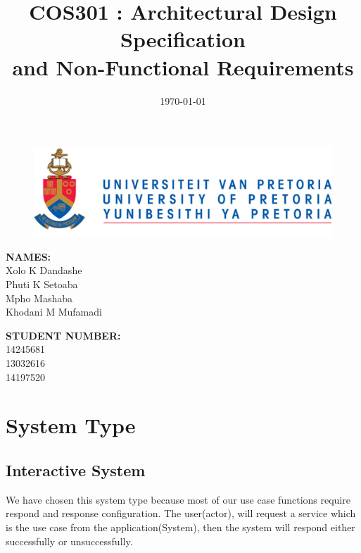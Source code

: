 \documentclass[english]{article}
\title{COS301 : Architectural Design Specification \\and Non-Functional Requirements}
\date{\today}
\begin{document}
	\maketitle
	\begin{figure}[!t]
		\includegraphics{up_logo.png}
	\end{figure}
	\begin{minipage}{0.4\textwidth}
		\begin{flushleft} \large
			\textbf{NAMES:}\\[0.4cm]
			Xolo K Dandashe\\
			Phuti K Setoaba\\
			Mpho Mashaba\\	
			Khodani M Mufamadi

		\end{flushleft}
	\end{minipage}
	\begin{minipage}{0.4\textwidth}
		\begin{flushright} \large
			\textbf{STUDENT NUMBER:} \\[0.4cm]
		 	14245681\\ 	
		 	13032616\\					
		 	14197520
		\end{flushright}
	\end{minipage}


	
	\newpage

	\tableofcontents
	
	\newpage
	\section{System Type} 
	\subsection{Interactive System}
		We have chosen this system type because most of our use case functions require respond and response configuration. The user(actor), will request a service which is the use case from the application(System), then the system will respond either successfully or unsuccessfully.
		
\end{document}
